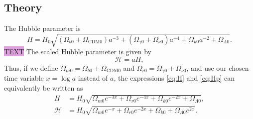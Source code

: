 \documentclass{aa}
\begin{document}
\subsection{Theory}\label{subsec: I theory}
The Hubble parameter is
\begin{equation}
  H = H_0\sqrt{\left(\Omega_{b0} + \Omega_\text{CDM0}\right)a^{-3} 
  + \left(\Omega_{\gamma0} + \Omega_{\nu0}\right)a^{-4}
  + \Omega_{k0}a^{-2} + \Omega_{\Lambda0}}. \label{eq:H}
\end{equation}
\colorbox{Plum}{TEXT}
The scaled Hubble parameter is given by
\begin{equation}
  \mathcal{H} = aH, \label{eq:Hp}
\end{equation}
Thus, if we define $\Omega_{m0} = \Omega_{b0}+\Omega_\text{CDM0}$ and $\Omega_{r0} = \Omega_{\gamma0}+\Omega_{\nu0}$, and use our chosen time variable $x=\log a$ instead of $a$, the expressions \eqref{eq:H} and \eqref{eq:Hp} can equivalently be written as
\begin{align}
  H &= H_0
  \sqrt{\Omega_{m0}e^{-3x} 
  + \Omega_{r0}e^{-4x}
  + \Omega_{k0}e^{-2x} + \Omega_{\Lambda0}},
  \\
  \mathcal{H} &= H_0
  \sqrt{\Omega_{m0}e^{-x} 
  + \Omega_{r0}e^{-2x}
  + \Omega_{k0} + \Omega_{\Lambda0}e^{2x}}.
\end{align}
\end{document}
